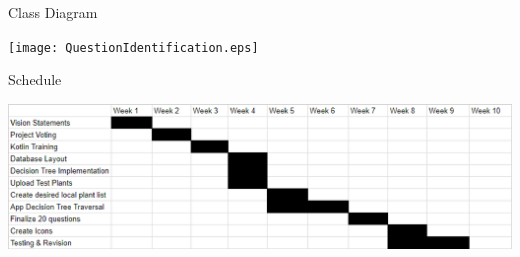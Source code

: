 \documentclass{beamer}
\begin{document}
\begin{frame}{Class Diagram}
\begin{center}\texttt{[image: QuestionIdentification.eps]}\end{center}
\end{frame}
\begin{frame}{Schedule}
\begin{center}\includegraphics[scale=.48]{schedule.eps}\end{center}
\end{frame}
\end{document}
